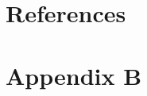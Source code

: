 








\appendix
\renewcommand\chaptername{Appendix}

\chapter{References}

\printbibliography[heading=none,title={}]

\renewcommand{\thechapter}{B}
\renewcommand\chaptername{Appendix B}

\chapter{Appendix B}


